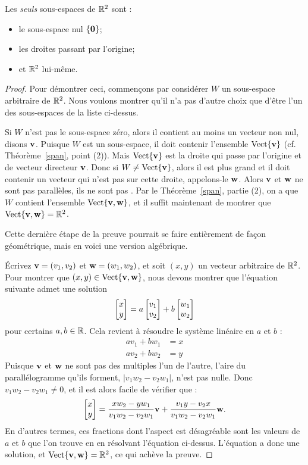 \begin{theorem}\label{subspaces$R^2$}
Les \emph{seuls} sous-espaces de $\mathbb{R}^2$ sont :
\begin{itemize}
\item le sous-espace nul $\{\mathbf{0}\}$;
\item les droites passant par l'origine; 
\item et $\mathbb{R}^2$ lui-même.
\end{itemize}
\end{theorem}

\begin{proof}
Pour démontrer ceci, commençons par considérer $W$ un sous-espace arbitraire de $\mathbb{R}^2$.
Nous voulons montrer qu'il n'a pas d'autre choix que d'être l'un des sous-espaces de la liste ci-dessus.

Si $W$ n'est pas le sous-espace zéro,
alors il contient au moins un vecteur non nul, disons $\mathbf{v}$.  
Puisque $W$ est un sous-espace, il doit contenir l'ensemble $\operatorname{ Vect} \normalsize\{\mathbf{v}\normalsize\}$ (cf. Théorème~\ref{span}, point (2)).
Mais $\operatorname{ Vect} \normalsize\{\mathbf{v}\normalsize\}$ est la droite qui passe par l'origine et de vecteur directeur $\mathbf{v}$.
Donc si $W \neq \operatorname{ Vect} \normalsize\{\mathbf{v}\normalsize\}$, alors il est plus grand et il doit contenir
un vecteur qui n'est pas sur cette droite, appelons-le $\mathbf{w}$.
Alors $\mathbf{v}$ et $\mathbf{w}$ ne sont pas parallèles, ils ne sont pas .
Par le Théorème~\ref{span}, partie (2), on a que $W$ contient l'ensemble $\textrm{Vect}\{\mathbf{v},\mathbf{w}\}$, et il suffit maintenant de montrer que $\textrm{Vect}\{\mathbf{v},\mathbf{w}\} = \mathbb{R}^2$.

Cette dernière étape de la preuve pourrait se faire entièrement de fa\c{c}on géométrique, mais en voici une version algébrique.

\'Ecrivez $\mathbf{v} = (v_1,v_2)$ et $\mathbf{w} = (w_1,w_2)$, et soit $(x,y)$ un vecteur arbitraire de $\mathbb{R}^2$.  Pour montrer que $(x,y) \in \textrm{Vect}\{\mathbf{v},\mathbf{w}\}$,
nous devons montrer que l'équation suivante admet une solution
$$
\left[ \begin{matrix} x\\y \end{matrix} \right] = a\left[ \begin{matrix} v_1\\ v_2 \end{matrix} \right] + b\left[ \begin{matrix} w_1\\w_2 \end{matrix} \right]
$$
pour certains $a,b \in \mathbb{R}$.  Cela revient à résoudre le système linéaire en $a$ et $b$ :
\begin{align*}
av_1+bw_1 &= x\\
av_2+bw_2 &= y
\end{align*}
Puisque $\mathbf{v}$ et $\mathbf{w}$ ne sont pas des multiples l'un de l'autre, l'aire du parallélogramme qu'ils forment, $|v_1w_2-v_2w_1|$, n'est pas nulle. Donc $v_1w_2-v_2w_1 \not=0$, et il est alors facile de
vérifier que :
$$
\left[ \begin{matrix} x\\y \end{matrix} \right] = \frac{xw_2-yw_1}{v_1w_2-v_2w_1}\mathbf{v} + \frac{v_1y-v_2x}{v_1w_2-v_2w_1}\mathbf{w}.
$$
En d'autres termes, ces fractions dont l'aspect est désagréable sont les valeurs de $a$ et $b$ que l'on trouve en
en résolvant l'équation ci-dessus. L'équation a donc une solution, et $\textrm{Vect}\{\mathbf{v},\mathbf{w}\} = \mathbb{R}^2$, ce qui achève la preuve.


\end{proof}
